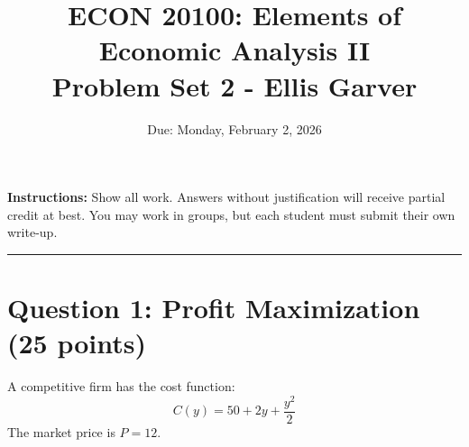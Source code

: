 \documentclass[11pt]{article}
\title{ECON 20100: Elements of Economic Analysis II\\Problem Set 2 - Ellis Garver}
\date{Due: Monday, February 2, 2026}
\author{}
\begin{document}
\maketitle

\noindent\textbf{Instructions:} Show all work. Answers without justification will receive partial credit at best. You may work in groups, but each student must submit their own write-up.

\vspace{0em}
\noindent\rule{\textwidth}{0.4pt}

\section*{Question 1: Profit Maximization (25 points)}

A competitive firm has the cost function:
\[
C(y) = 50 + 2y + \frac{y^2}{2}
\]
The market price is $P = 12$.
\end{document}
